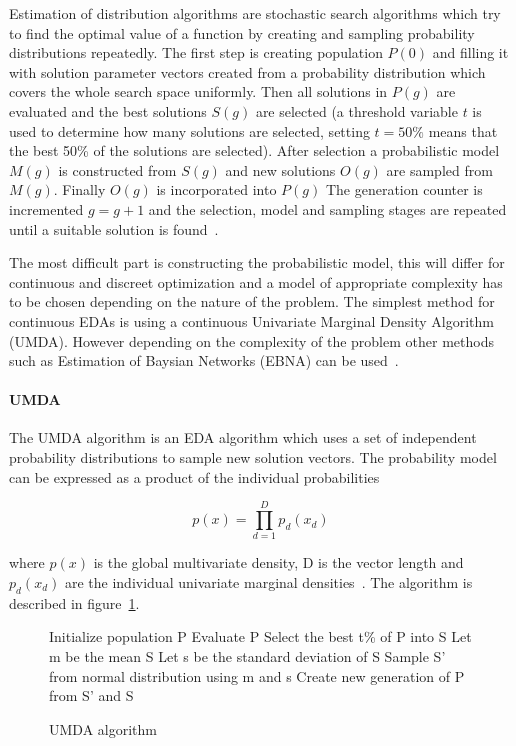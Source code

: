 Estimation of distribution algorithms are stochastic search algorithms which try to find the optimal value of a function by creating and sampling probability distributions repeatedly. The first step is creating population $P(0)$ and filling it with solution parameter vectors created from a probability distribution which covers the whole search space uniformly. Then all solutions in $P(g)$ are evaluated and the best solutions $S(g)$ are selected (a threshold variable $t$ is used to determine how many solutions are selected, setting $t=50\%$ means that the best 50\% of the solutions are selected). After selection a probabilistic model $M(g)$ is constructed from $S(g)$ and new solutions $O(g)$ are sampled from $M(g)$. Finally $O(g)$ is incorporated into $P(g)$ The generation counter is incremented $g = g + 1$ and the selection, model and sampling stages are repeated until a suitable solution is found~\cite{Hauschild2011111}.

The most difficult part is constructing the probabilistic model, this will differ for continuous and discreet optimization and a model of appropriate complexity has to be chosen depending on the nature of the problem. The simplest method for continuous EDAs is using a continuous Univariate Marginal Density Algorithm (UMDA). However depending on the complexity of the problem other methods such as Estimation of Baysian Networks (EBNA) can be used~\cite{larranaga2012review}.

\paragraph{UMDA}
The UMDA algorithm is an EDA algorithm which uses a set of independent probability distributions to sample new solution vectors. The probability model can be expressed as a product of the individual probabilities

\begin{equation}
  p(x) = \prod _{d=1}^D {p_d(x_d)}
\end{equation}

where $p(x)$ is the global multivariate density, D is the vector length and $p_d(x_d)$ are the individual univariate marginal densities~\cite{povsik2004estimation}. The algorithm is described in figure~\ref{algo:umda}.

\begin{figure}[h]
  \centering
  \begin{minipage}{12.5cm}
    \begin{algorithmic}
      \State Initialize population P
      \Repeat
        \State Evaluate P
        \State Select the best t\% of P into S
        \State Let m be the mean S
        \State Let s be the standard deviation of S
        \State Sample S' from normal distribution using m and s
        \State Create new generation of P from S' and S
    \end{algorithmic}
  \end{minipage}
  \caption{UMDA algorithm}
  \label{algo:umda}
\end{figure}


